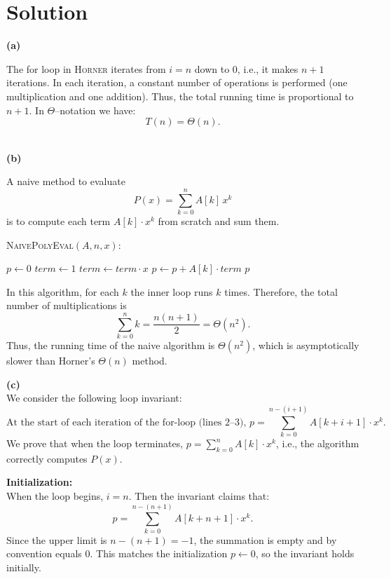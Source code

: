 \documentclass[11pt]{article}
\begin{document}
    \section*{Solution}

    \textbf{(a)}
    
    The for loop in \textsc{Horner} iterates from $i=n$ down to $0$, i.e., it makes $n+1$ iterations. In each iteration, a constant number of operations is performed (one multiplication and one addition). Thus, the total running time is proportional to $n+1$. In $\Theta$--notation we have:
    \[
    T(n)=\Theta(n).
    \]
    
    \vspace{2mm}
    \\
    \textbf{(b)}
    
    A naive method to evaluate
    \[
    P(x) = \sum_{k=0}^n A[k] \, x^k
    \]
    is to compute each term \(A[k] \cdot x^k\) from scratch and sum them. 
    
    \bigskip
    \textsc{NaivePolyEval}$(A, n, x)$:
    \begin{algorithmic}[1]
        \STATE $p \gets 0$
            \STATE $term \gets 1$
                \STATE $term \gets term \cdot x$
            \ENDFOR
            \STATE $p \gets p + A[k] \cdot term$
        \ENDFOR
        \RETURN $p$
    \end{algorithmic}
    \bigskip
    
    In this algorithm, for each $k$ the inner loop runs $k$ times. Therefore, the total number of multiplications is
    \[
    \sum_{k=0}^{n} k = \frac{n(n+1)}{2} = \Theta(n^2).
    \]
    Thus, the running time of the naive algorithm is $\Theta(n^2)$, which is asymptotically slower than Horner's $\Theta(n)$ method.
    
    \vspace{2mm}
    \textbf{(c)}
    \\
    We consider the following loop invariant:
    \[
    \text{At the start of each iteration of the for-loop (lines 2--3), } p = \sum_{k=0}^{n-(i+1)} A[k+i+1] \cdot x^k.
    \]
    We prove that when the loop terminates, $p = \sum_{k=0}^n A[k]\cdot x^k$, i.e., the algorithm correctly computes $P(x)$.
    
    \textbf{Initialization:} \\
    When the loop begins, $i = n$. Then the invariant claims that:
    \[
    p = \sum_{k=0}^{n-(n+1)} A[k+n+1] \cdot x^k.
    \]
    Since the upper limit is $n-(n+1) = -1$, the summation is empty and by convention equals $0$. This matches the initialization $p \gets 0$, so the invariant holds initially.
    
\end{document}
